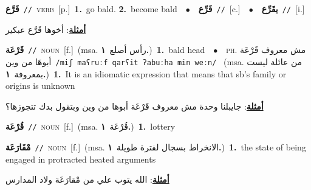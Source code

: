 \documentclass[10pt,a4paper,twoside]{article} %
\begin{document}
\begin{multicols}{2}
{\setlength\topsep{0pt}\textbf{\foreignlanguage{arabic}{قَرَّع}}\ {\color{gray}\texttt{//}\color{black}}\ \textsc{verb}\ [p.]\ \textbf{1.}~go bald.  \textbf{2.}~become bald\ \ $\bullet$\ \ \setlength\topsep{0pt}\textbf{\foreignlanguage{arabic}{قَرِّع}}\ {\color{gray}\texttt{//}\color{black}}\ [c.]\ \ $\bullet$\ \ \setlength\topsep{0pt}\textbf{\foreignlanguage{arabic}{يقَرِّع}}\ {\color{gray}\texttt{//}\color{black}}\ [i.]\  \begin{flushright}\color{gray}\foreignlanguage{arabic}{\textbf{\underline{\foreignlanguage{arabic}{أمثلة}}}: أخوها قَرَّع عبكير}\end{flushright}\color{black}} \vspace{2mm}

{\setlength\topsep{0pt}\textbf{\foreignlanguage{arabic}{قَرْعَة}}\ {\color{gray}\texttt{//}\color{black}}\ \textsc{noun}\ [f.]\ \color{gray}(msa. \foreignlanguage{arabic}{رأس أصلع}~\foreignlanguage{arabic}{\textbf{١.}})\color{black}\ \textbf{1.}~bald head\ \ $\bullet$\ \ \textsc{ph.} \color{gray} \foreignlanguage{arabic}{مش معروف قَرْعَة أبوهَا من وين}\color{black}\ {\color{gray}\texttt{/{\sffamily miʃ maʕruːf qarʕit ʔabuːha min weːn}/}\color{black}}\ \color{gray} (msa. \foreignlanguage{arabic}{من عائلة ليست بمعروفة}~\foreignlanguage{arabic}{\textbf{١.}})\color{black}\ \textbf{1.}~It is an idiomatic expression that means that sb's family or origins is unknown\  \begin{flushright}\color{gray}\foreignlanguage{arabic}{\textbf{\underline{\foreignlanguage{arabic}{أمثلة}}}: جايبلنا وحدة مش معروف قَرْعَة أبوها من وين وبتقول بدك تتجوزها؟}\end{flushright}\color{black}} \vspace{2mm}

{\setlength\topsep{0pt}\textbf{\foreignlanguage{arabic}{قُرْعَة}}\ {\color{gray}\texttt{//}\color{black}}\ \textsc{noun}\ [f.]\ \color{gray}(msa. \foreignlanguage{arabic}{قُرْعَة}~\foreignlanguage{arabic}{\textbf{١.}})\color{black}\ \textbf{1.}~lottery\ } \vspace{2mm}

{\setlength\topsep{0pt}\textbf{\foreignlanguage{arabic}{مْقَارَعَة}}\ {\color{gray}\texttt{//}\color{black}}\ \textsc{noun}\ [f.]\ \color{gray}(msa. \foreignlanguage{arabic}{الانخراط بسجال لفترة طويلة}~\foreignlanguage{arabic}{\textbf{١.}})\color{black}\ \textbf{1.}~the state of being engaged in protracted heated arguments\  \begin{flushright}\color{gray}\foreignlanguage{arabic}{\textbf{\underline{\foreignlanguage{arabic}{أمثلة}}}: الله يتوب علي من مْقارَعَة ولاد المدارس}\end{flushright}\color{black}} \vspace{2mm}


\end{multicols}
\end{document}
